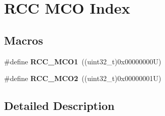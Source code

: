 \hypertarget{group___r_c_c___m_c_o___index}{}\section{R\+CC M\+CO Index}
\label{group___r_c_c___m_c_o___index}
\subsection*{Macros}
\begin{DoxyCompactItemize}
\item 
\mbox{\label{group___r_c_c___m_c_o___index_ga152dd1ae9455e528526c4e23a817937b}} 
\#define {\bfseries R\+C\+C\+\_\+\+M\+C\+O1}~((uint32\+\_\+t)0x00000000\+U)
\item 
\mbox{\label{group___r_c_c___m_c_o___index_ga248f59fc2868f83bea4f2d182edcdf4c}} 
\#define {\bfseries R\+C\+C\+\_\+\+M\+C\+O2}~((uint32\+\_\+t)0x00000001\+U)
\end{DoxyCompactItemize}


\subsection{Detailed Description}
